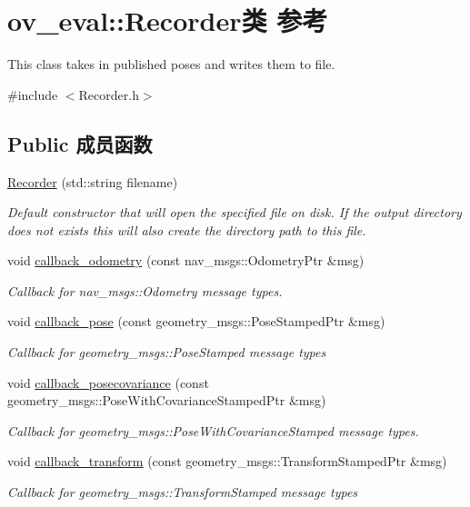 \hypertarget{classov__eval_1_1Recorder}{}\section{ov\+\_\+eval\+:\+:Recorder类 参考}
\label{classov__eval_1_1Recorder}


This class takes in published poses and writes them to file.  




{\ttfamily \#include $<$Recorder.\+h$>$}

\subsection*{Public 成员函数}
\begin{DoxyCompactItemize}
\item 
\hyperlink{classov__eval_1_1Recorder_a36307659369029395731737a7577bf0a}{Recorder} (std\+::string filename)
\begin{DoxyCompactList}\small\item\em Default constructor that will open the specified file on disk. If the output directory does not exists this will also create the directory path to this file. \end{DoxyCompactList}\item 
void \hyperlink{classov__eval_1_1Recorder_a731eae3cf076afc70a7e590f5e8943fe}{callback\+\_\+odometry} (const nav\+\_\+msgs\+::\+Odometry\+Ptr \&msg)
\begin{DoxyCompactList}\small\item\em Callback for nav\+\_\+msgs\+::\+Odometry message types. \end{DoxyCompactList}\item 
void \hyperlink{classov__eval_1_1Recorder_a0a2cc6684a70ab530c8d7c31ebc1ba9e}{callback\+\_\+pose} (const geometry\+\_\+msgs\+::\+Pose\+Stamped\+Ptr \&msg)
\begin{DoxyCompactList}\small\item\em Callback for geometry\+\_\+msgs\+::\+Pose\+Stamped message types \end{DoxyCompactList}\item 
void \hyperlink{classov__eval_1_1Recorder_afe156131ed31a4f35d7fea30d4221293}{callback\+\_\+posecovariance} (const geometry\+\_\+msgs\+::\+Pose\+With\+Covariance\+Stamped\+Ptr \&msg)
\begin{DoxyCompactList}\small\item\em Callback for geometry\+\_\+msgs\+::\+Pose\+With\+Covariance\+Stamped message types. \end{DoxyCompactList}\item 
void \hyperlink{classov__eval_1_1Recorder_aa98f2bf8b8f3bfc70c905d83a778065b}{callback\+\_\+transform} (const geometry\+\_\+msgs\+::\+Transform\+Stamped\+Ptr \&msg)
\begin{DoxyCompactList}\small\item\em Callback for geometry\+\_\+msgs\+::\+Transform\+Stamped message types \end{DoxyCompactList}\end{DoxyCompactItemize}
